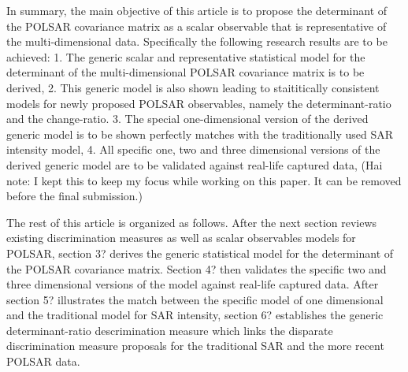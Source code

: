 \documentclass[journal]{IEEEtran}
\begin{document}

In summary, the main objective of this article is to propose the determinant of the POLSAR covariance matrix as a scalar observable
  that is representative of the multi-dimensional data.
Specifically the following research results are to be achieved:
  1. The generic scalar and representative statistical model for the determinant of the multi-dimensional POLSAR covariance matrix is to be derived, 
  2. This generic model is also shown leading to staititically consistent models for newly proposed POLSAR observables, namely the determinant-ratio and the change-ratio.
  3. The special one-dimensional version of the derived generic model is to be shown perfectly matches with the traditionally used SAR intensity model,
  4. All specific one, two and three dimensional versions of the derived generic model are to be validated against real-life captured data,
(Hai note: I kept this to keep my focus while working on this paper.
  It can be removed before the final submission.)
  
The rest of this article is organized as follows.
After the next section reviews existing discrimination measures as well as scalar observables models for POLSAR,
  section 3? derives the generic statistical model for the determinant of the POLSAR covariance matrix.
Section 4? then validates the specific two and three dimensional versions of the model against real-life captured data.
After section 5? illustrates the match between the specific model of one dimensional and the traditional model for SAR intensity,
  section 6? establishes the generic determinant-ratio descrimination measure which links the disparate discrimination measure proposals for the traditional SAR and the more recent POLSAR data.
\end{document}
